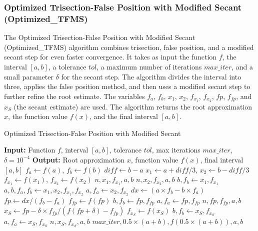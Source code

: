 \documentclass[reprint, amsmath, amssymb, aps, prl]{revtex4-2}
\begin{document}
\subsubsection{Optimized Trisection-False Position with Modified Secant (Optimized\_TFMS)}

The Optimized Trisection-False Position with Modified Secant (Optimized\_TFMS) algorithm combines trisection, false position, and a modified secant step for even faster convergence. It takes as input the function $f$, the interval $[a, b]$, a tolerance $tol$, a maximum number of iterations $max\_iter$, and a small parameter $\delta$ for the secant step. The algorithm divides the interval into three, applies the false position method, and then uses a modified secant step to further refine the root estimate. The variables $f_a$, $f_b$, $x_1$, $x_2$, $f_{x_1}$, $f_{x_2}$, $fp$, $f_{fp}$, and $x_S$ (the secant estimate) are used. The algorithm returns the root approximation $x$, the function value $f(x)$, and the final interval $[a, b]$.

\vspace{1em}
\begin{algorithm}[h!]
\caption{Optimized Trisection-False Position with Modified Secant}
\begin{algorithmic}[1]
\State \textbf{Input:} Function $f$, interval $[a, b]$, tolerance $tol$, max iterations $max\_iter$, $\delta = 10^{-4}$
\State \textbf{Output:} Root approximation $x$, function value $f(x)$, final interval $[a, b]$
\State $f_a \gets f(a)$, $f_b \gets f(b)$
    \State $diff \gets b - a$
    \State $x_1 \gets a + diff/3$, $x_2 \gets b - diff/3$
    \State $f_{x_1} \gets f(x_1)$, $f_{x_2} \gets f(x_2)$
        \State \Return $n, x_1, f_{x_1}, a, b$
    \EndIf
        \State \Return $n, x_2, f_{x_2}, a, b$
    \EndIf
        \State $b, f_b \gets x_1, f_{x_1}$
        \State $a, b, f_a, f_b \gets x_1, x_2, f_{x_1}, f_{x_2}$
    \Else
        \State $a, f_a \gets x_2, f_{x_2}$
    \EndIf
    \State $dx \gets (a \times f_b - b \times f_a)$
    \State $fp \gets dx / (f_b - f_a)$
    \State $f_{fp} \gets f(fp)$
        \State $b, f_b \gets fp, f_{fp}$
    \Else
        \State $a, f_a \gets fp, f_{fp}$
    \EndIf
        \State \Return $n, fp, f_{fp}, a, b$
    \EndIf
    \State $x_S \gets fp - \delta \times f_{fp} / (f(fp + \delta) - f_{fp})$
        \State $f_{x_S} \gets f(x_S)$
                \State $b, f_b \gets x_S, f_{x_S}$
            \Else
                \State $a, f_a \gets x_S, f_{x_S}$
            \EndIf
                \State \Return $n, x_S, f_{x_S}, a, b$
            \EndIf
        \EndIf
    \EndIf
\EndFor
\State \Return $max\_iter, 0.5 \times (a + b), f(0.5 \times (a + b)), a, b$
\end{algorithmic}
\end{algorithm}
\vspace{1em}
\end{document}
